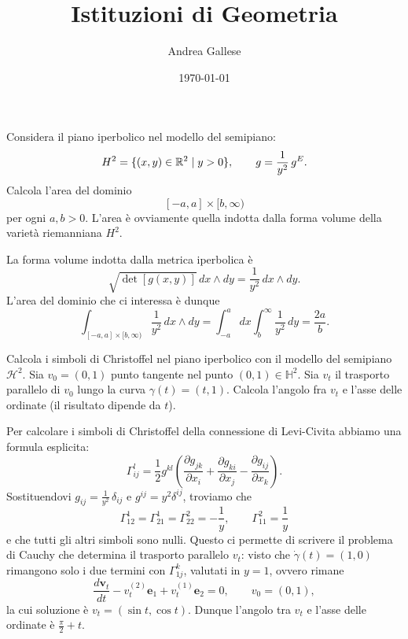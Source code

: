 \documentclass[a4paper]{article}
\title{Istituzioni di Geometria}\let\Title\@title
\author{Andrea Gallese}\let\Author\@author
\date{\today}\let\Date\@date
\begin{document}
	\Intitola
	
\begin{ex}[9.1]{Considera il piano iperbolico nel modello del semipiano: \[ H^2= \{ (x, y) \in \mathbb{R}^2 \mid y > 0 \}, \qquad g = \frac{1}{y^2}\, g^E. \]
	Calcola l’area del dominio
	\[[-a, a] \times [b, \infty)\]
	per ogni $ a, b > 0 $. L’area è ovviamente quella indotta dalla forma volume della varietà riemanniana $ H^2 $.}
	
	La forma volume indotta dalla metrica iperbolica è 
	\[ \sqrt{\det[g(x, y)]} \, dx \wedge dy = \frac{1}{y^2}\, dx \wedge dy. \]
	L'area del dominio che ci interessa è dunque
	\[ \int_{[-a, a] \times [b, \infty)} \frac{1}{y^2}\, dx \wedge dy = \int_{-a}^a dx \int_b^\infty \frac{1}{y^2}\,dy = \frac{2a}{b}. \]
\end{ex}

\begin{ex}[9.3]{Calcola i simboli di Christoffel nel piano iperbolico con il modello del semipiano $ \mathcal{H}^2 $. Sia $ v_0 = (0, 1) $ punto tangente nel punto $ (0, 1) \in \mathbb{H}^2 $. Sia $ v_t $ il trasporto parallelo di $ v_0 $ lungo la curva $ \gamma(t) = (t, 1) $. Calcola l’angolo fra $ v_t $ e l’asse delle ordinate (il risultato dipende da $ t $).}
	
	Per calcolare i simboli di Christoffel della connessione di Levi-Civita abbiamo una formula esplicita:
	\[ \Gamma_{ij}^l = \frac{1}{2}g^{kl} \left(  \frac{\partial g_{jk}}{\partial x_i} + \frac{\partial g_{ki}}{\partial x_j} - \frac{\partial g_{ij}}{\partial x_k} \right).  \]
	Sostituendovi $ g_{ij} = \frac{1}{y^2}\,\delta_{ij} $ e $ g^{ij} = y^2 \delta^{ij} $, troviamo che
	\[ \Gamma_{12}^1 = \Gamma_{21}^1 = \Gamma_{22}^2 = -\frac{1}{y}, \qquad \Gamma_{11}^2 = \frac{1}{y} \]
	e che tutti gli altri simboli sono nulli. Questo ci permette di scrivere il problema di Cauchy che determina il trasporto parallelo $ v_t $: visto che $ \dot{\gamma}(t) = (1, 0) $ rimangono solo i due termini con $ \Gamma_{1j}^k $, valutati in $ y = 1 $, ovvero rimane
	\[ \frac{d\textbf{v}_t}{dt} - v_t^{(2)} \textbf{e}_1 + v_t^{(1)} \textbf{e}_2 = 0, \qquad v_0 = (0, 1), \]
	la cui soluzione è $ v_t = (\sin t, \cos t) $. Dunque l'angolo tra $ v_t $ e l'asse delle ordinate è $ \frac{\pi}{2}+t $.
\end{ex}
	
\end{document}

